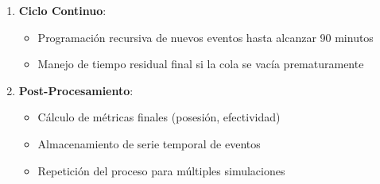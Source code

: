 \documentclass{article}
\begin{document}
\begin{enumerate}
    \item \textbf{Ciclo Continuo}:
    \begin{itemize}
        \item Programación recursiva de nuevos eventos hasta alcanzar 90 minutos
        \item Manejo de tiempo residual final si la cola se vacía prematuramente
    \end{itemize}
    
    \item \textbf{Post-Procesamiento}:
    \begin{itemize}
        \item Cálculo de métricas finales (posesión, efectividad)
        \item Almacenamiento de serie temporal de eventos
        \item Repetición del proceso para múltiples simulaciones
    \end{itemize}
\end{enumerate}
\end{document}
